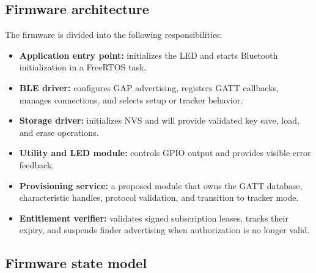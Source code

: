 \documentclass[12pt,a4paper]{article}
\begin{document}
\subsection{Firmware architecture}

The firmware is divided into the following responsibilities:

\begin{itemize}
    \item \textbf{Application entry point:} initializes the LED and starts
    Bluetooth initialization in a FreeRTOS task.
    \item \textbf{BLE driver:} configures GAP advertising, registers GATT
    callbacks, manages connections, and selects setup or tracker behavior.
    \item \textbf{Storage driver:} initializes NVS and will provide validated
    key save, load, and erase operations.
    \item \textbf{Utility and LED module:} controls GPIO output and provides
    visible error feedback.
    \item \textbf{Provisioning service:} a proposed module that owns the GATT
    database, characteristic handles, protocol validation, and transition to
    tracker mode.
    \item \textbf{Entitlement verifier:} validates signed subscription leases,
    tracks their expiry, and suspends finder advertising when authorization is
    no longer valid.
\end{itemize}

\subsection{Firmware state model}
\end{document}
